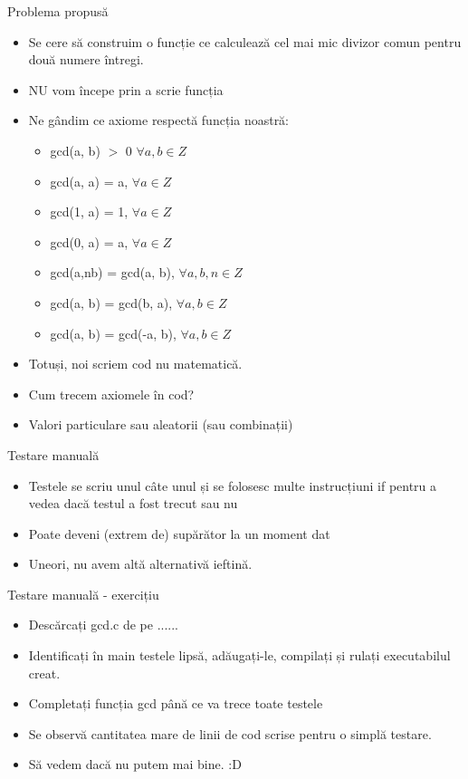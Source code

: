 \documentclass{beamer}
\begin{document}
\begin{frame}{Problema propusă}
\begin{itemize}
\item Se cere să construim o funcție ce calculează cel mai mic divizor comun pentru două numere întregi.
\item \pause NU vom începe prin a scrie funcția
\item \pause Ne gândim ce axiome respectă funcția noastră:
\begin{itemize}
\item \pause gcd(a, b) $>$ 0 $\forall a,b \in Z$
\item gcd(a, a) = a, $\forall a \in Z$
\item gcd(1, a) = 1, $\forall a \in Z$
\item gcd(0, a) = a, $\forall a \in Z$
\item gcd(a,nb) = gcd(a, b), $\forall a,b,n \in Z$
\item gcd(a, b) = gcd(b, a), $\forall a,b \in Z$
\item gcd(a, b) = gcd(-a, b), $\forall a,b \in Z$
\end{itemize}
\item \pause Totuși, noi scriem cod nu matematică.
\item \pause Cum trecem axiomele în cod?
\item \pause Valori particulare sau aleatorii (sau combinații)
\end{itemize}
\end{frame}

\begin{frame}{Testare manuală}
\begin{itemize}
\item Testele se scriu unul câte unul și se folosesc multe instrucțiuni if pentru a vedea dacă testul a fost trecut sau nu
\item \pause Poate deveni (extrem de) supărător la un moment dat
\item \pause Uneori, nu avem altă alternativă ieftină.
\end{itemize}
\end{frame}

\begin{frame}{Testare manuală - exercițiu}
\begin{itemize}
\item Descărcați gcd.c de pe ......
\item Identificați în main testele lipsă, adăugați-le, compilați și rulați executabilul creat.
\item \pause Completați funcția gcd până ce va trece toate testele
\item \pause Se observă cantitatea mare de linii de cod scrise pentru o simplă testare.
\item \pause Să vedem dacă nu putem mai bine. :D
\end{itemize}
\end{frame}
\end{document}
